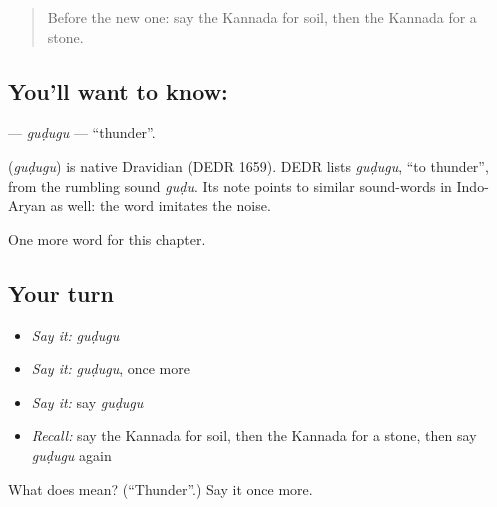 \begin{quote}
Before the new one: say the Kannada for soil, then the Kannada for a stone.
\end{quote}

\subsection*{You'll want to know: }
\textbf{} — \emph{guḍugu} — \textquotedblleft{}thunder\textquotedblright{}.

\begin{cousinweb}
\textbf{} (\emph{guḍugu}) is native Dravidian (DEDR 1659). DEDR lists \emph{guḍugu}, \textquotedblleft{}to thunder\textquotedblright{}, from the rumbling sound \emph{guḍu}. Its note points to similar sound-words in Indo-Aryan as well: the word imitates the noise.
\end{cousinweb}

\begin{grammarlens}[title={What you've built}]
One more word for this chapter.
\end{grammarlens}

\subsection*{Your turn}
\begin{itemize}
\raggedright
  \item \emph{Say it:} \emph{guḍugu}
  \item \emph{Say it:} \emph{guḍugu}, once more
  \item \emph{Say it:} say \emph{guḍugu}
  \item \emph{Recall:} say the Kannada for soil, then the Kannada for a stone, then say \emph{guḍugu} again
\end{itemize}

\begin{tcolorbox}[breakable,colback=teal!4,colframe=teal!35!black,title={Before you move on}]
What does  mean? (\textquotedblleft{}Thunder\textquotedblright{}.) Say it once more.
\end{tcolorbox}
